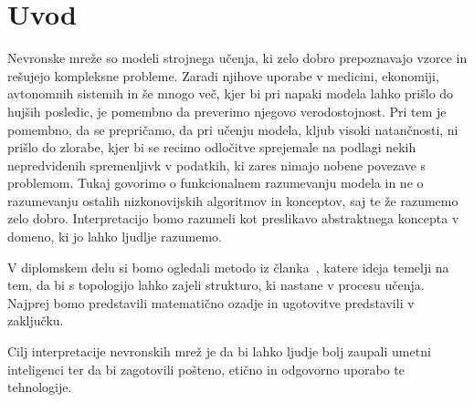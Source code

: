 \chapter{Uvod}

Nevronske mreže so modeli strojnega učenja, ki zelo dobro prepoznavajo vzorce in rešujejo kompleksne probleme. Zaradi njihove uporabe v medicini, ekonomiji, avtonomnih sistemih in še mnogo več, kjer bi pri napaki modela lahko prišlo do hujših posledic, je pomembno da preverimo njegovo verodostojnost. Pri tem je pomembno, da se prepričamo, da pri učenju modela, kljub visoki natančnosti, ni prišlo do zlorabe, kjer bi se recimo odločitve sprejemale na podlagi nekih nepredvidenih spremenljivk v podatkih, ki zares nimajo nobene povezave s problemom. Tukaj govorimo o funkcionalnem razumevanju modela in ne o razumevanju ostalih nizkonovijskih algoritmov in konceptov, saj te že razumemo zelo dobro. Interpretacijo bomo razumeli kot preslikavo abstraktnega koncepta v domeno, ki jo lahko ljudlje razumemo.\cite{MONTAVON20181}

V diplomskem delu si bomo ogledali metodo iz članka~\cite{Gabella2021}, katere ideja temelji na tem, da bi s topologijo lahko zajeli strukturo, ki nastane v procesu učenja. Najprej bomo predstavili matematično ozadje in ugotovitve predstavili v zaključku.

Cilj interpretacije nevronskih mrež je da bi lahko ljudje bolj zaupali umetni inteligenci ter da bi zagotovili pošteno, etično in odgovorno uporabo te tehnologije.

